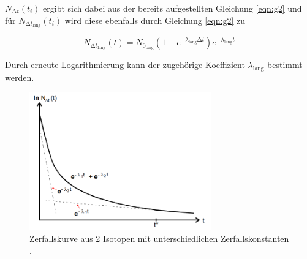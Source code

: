 \begin{flushleft}
$N_{\increment t}(t_{i})$ ergibt sich dabei aus der bereits aufgestellten Gleichung \eqref{eqn:g2} und für $N_{{\increment t}_{\text{lang}}}(t_{i})$ wird diese ebenfalls durch Gleichung \eqref{eqn:g2} zu
\end{flushleft}
\begin{equation}
N_{\increment t_{\text{lang}}}(t) = N_{{0}_{\text{lang}}} (1-e^{-{\lambda}_{\text{lang}} \increment t}) e^{-{\lambda}_{\text{lang}} t}
\end{equation}
\begin{flushleft}
Durch erneute Logarithmierung kann der zugehörige Koeffizient $\lambda_{\text{lang}}$ bestimmt werden. 
\end{flushleft}
\begin{figure}
  \centering
  \includegraphics[width=0.7\textwidth]{bilder/AbbildungKurve.png}
  \caption{Zerfallskurve aus 2 Isotopen mit unterschiedlichen Zerfallskonstanten \cite{skript}.}
  \label{fig:AbbildungKurve}
\end{figure}
